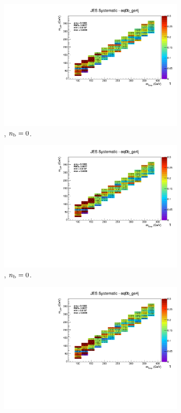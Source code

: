 \begin{figure}[ht!]
\begin{subfigure}[b]{0.32\textwidth}
    \includegraphics[width=\textwidth, page=12]{Figs/sms/t2degen/v19_2/systs/T2_4body_JES_eq0b_ge4j.pdf}
    \caption{\njhigh, $n_{\text{b}} = 0$.}
  \end{subfigure}
  \begin{subfigure}[b]{0.32\textwidth}
    \includegraphics[width=\textwidth, page=8]{Figs/sms/t2degen/v19_2/systs/T2_4body_JES_eq0b_ge4j.pdf}
    \caption{\njhigh, $n_{\text{b}} = 0$.}
  \end{subfigure}
  \begin{subfigure}[b]{0.32\textwidth}
    \includegraphics[width=\textwidth, page=1]{Figs/sms/t2degen/v19_2/systs/T2_4body_JES_eq0b_ge4j.pdf}

\end{subfigure}
\end{figure}
